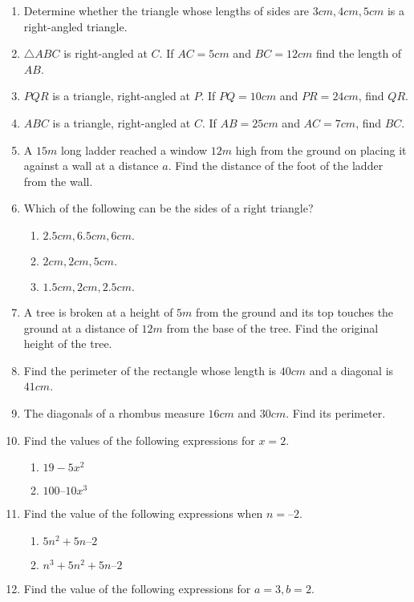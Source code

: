 \begin{enumerate}[label=\thesection.\arabic*, ref=\thesection.\theenumi]
\item Determine whether the triangle whose lengths of sides are $3 cm, 4 cm, 5 cm$ is a right-angled triangle.
\item $\triangle ABC$ is right-angled at $C$. If $AC = 5 cm$ and $BC = 12 cm$ find the length of $AB$.
\item $PQR$ is a triangle, right-angled at $P$. If $PQ = 10cm$ and $PR = 24 cm$, find $QR$.
\item $ABC$ is a triangle, right-angled at $C$. If $AB = 25 cm$ and $AC = 7 cm$, find $BC$.
\item A $15 m$ long ladder reached a window $12 m$ high from the ground on placing it against a wall at a distance $a$. Find the distance of the foot of the ladder from the wall.
\item  Which of the following can be the sides of a right triangle? 
\begin{enumerate}
	\item $2.5 cm,6.5 cm, 6 cm.$ 
	\item $ 2 cm, 2 cm, 5 cm.$ 
	\item $ 1.5 cm, 2cm, 2.5 cm.$
\end{enumerate}
\item A tree is broken at a height of $5 m$ from the ground and its top touches the ground at a distance of $12 m$ from the base of the tree. Find the original height of the tree.
\item Find the perimeter of the rectangle whose length is $40 cm$ and a diagonal is $41 cm$. 
\item The diagonals of a rhombus measure $16 cm$ and $30 cm$. Find its perimeter.
\item Find the values of the following expressions for $x = 2$. 
	\begin{enumerate}
\item  $19-5x^2$
\item  $100 – 10x^3$
	\end{enumerate}
\item Find the value of the following expressions when $n = – 2.$ 
	\begin{enumerate}
\item  $5n^2 + 5n – 2 $
\item  $n^3 + 5n^2 + 5n – 2$
	\end{enumerate}
\item Find the value of the following expressions for $a = 3, b = 2$. 

\end{enumerate}
